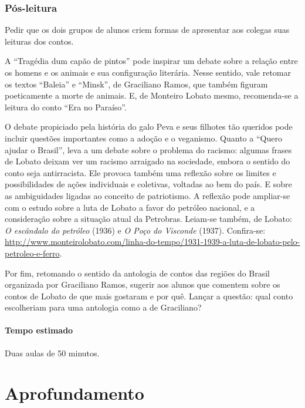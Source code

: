 \documentclass[12pt]{extarticle}
\begin{document}
\subsubsection{Pós-leitura}

Pedir que os dois grupos de alunos criem formas de apresentar aos
colegas suas leituras dos contos.

A ``Tragédia dum capão de pintos'' pode inspirar um debate sobre a
relação entre os homens e os animais e sua configuração literária. Nesse
sentido, vale retomar os textos ``Baleia'' e ``Minsk'', de Graciliano
Ramos, que também figuram poeticamente a morte de animais. E, de
Monteiro Lobato mesmo, recomenda-se a leitura do conto ``Era no
Paraíso''.

O debate propiciado pela história do galo Peva e seus filhotes tão
queridos pode incluir questões importantes como a adoção e o veganismo.
Quanto a ``Quero ajudar o Brasil'', leva a um debate sobre o problema do
racismo: algumas frases de Lobato deixam ver um racismo arraigado na
sociedade, embora o sentido do conto seja antirracista. Ele provoca
também uma reflexão sobre os limites e possibilidades de ações
individuais e coletivas, voltadas ao bem do país. E sobre as
ambiguidades ligadas ao conceito de patriotismo. A reflexão pode
ampliar-se com o estudo sobre a luta de Lobato a favor do petróleo
nacional, e a consideração sobre a situação atual da Petrobras. Leiam-se
também, de \textbar{}Lobato: \emph{O escândalo do petróleo} (1936) e
\emph{O Poço do Visconde} (1937). Confira-se:
\url{http://www.monteirolobato.com/linha-do-tempo/1931-1939-a-luta-de-lobato-pelo-petroleo-e-ferro}.

Por fim, retomando o sentido da antologia de contos das regiões do
Brasil organizada por Graciliano Ramos, sugerir aos alunos que comentem
sobre os contos de Lobato de que mais gostaram e por quê. Lançar a
questão: qual conto escolheriam para uma antologia como a de Graciliano?

\paragraph{Tempo estimado} Duas aulas de 50 minutos.

\section{Aprofundamento}

\end{document}
